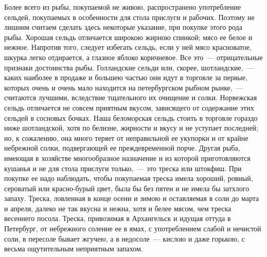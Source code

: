 Более всего из рыбы, покупаемой не живою, распространено употребление сельдей, покупаемых в особенности для стола прислуги и рабочих. Поэтому не лишним считаем сделать здесь некоторые указание, при покупке этого рода рыбы. Хорошая сельдь отличается широкою жирною спинкой; мясо ее белое и нежное. Напротив того, следует избегать сельдь, если у ней мясо красноватое, шкурка легко отдирается, а глазное яблоко коричневое. Все это~--- отрицательные признаки достоинства рыбы. Голландские сельди или, скорее, шотландские,~--- каких наиболее в продаже и большею частью они идут в торговле за первые, которых очень и очень мало находится на петербургском рыбном рынке,~--- считаются лучшими, вследствие тщательного их очищение и солки. Норвежская сельдь отличается не совсем приятным вкусом, зависящего от содержание этих сельдей в сосновых бочках. Наша беломорская сельдь стоить в торговле гораздо ниже шотландской, хотя по белизне, жирности и вкусу и не уступает последней; но, к сожалению, она много теряет от неправильной ее укупорки и от крайне небрежной солки, подвергающей ее преждевременной порче. Другая рыба, имеющая в хозяйстве многообразное назначение и из которой приготовляются кушанья и не для стола прислуги только,~--- это треска или штокфиш. При покупке ее надо наблюдать, чтобы покупаемая треска имела хороший, ровный, сероватый или красно-бурый цвет, была бы без пятен и не имела бы затхлого запаху. Треска, ловленная в конце осени и зимою и оставляемая в соли до марта и апреля, далеко не так вкусна и нежна, хотя и белее мясом, чем треска весеннего посола. Треска, привозимая в Архангельск и идущая оттуда в Петербург, от небрежного соление ее в ямах, с употреблением слабой и нечистой соли, в пересоле бывает жгучею, а в недосоле~--- кислою и даже горькою, с весьма ощутительным неприятным запахом.

